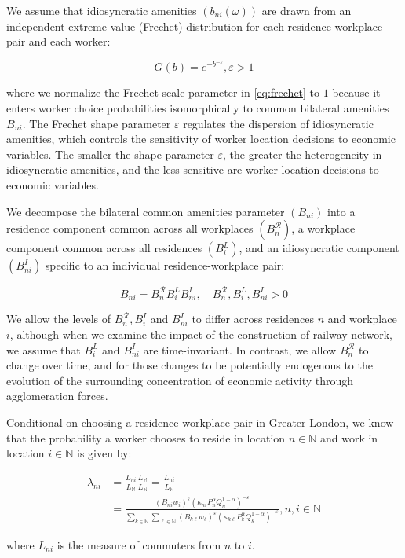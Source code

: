 We assume that idiosyncratic amenities $(b_{ni}(\omega))$ are drawn from an independent extreme value (Frechet) distribution for each residence-workplace pair and each worker:

\begin{equation}
    G(b) = e^{-b^{-\varepsilon}}, \varepsilon > 1 \label{eq:frechet}
\end{equation}

where we normalize the Frechet scale parameter in \eqref{eq:frechet} to $1$ because it enters worker choice probabilities isomorphically to common bilateral amenities $B_{ni}$. The Frechet shape parameter $\varepsilon$ regulates the dispersion of idiosyncratic amenities, which controls the sensitivity of worker location decisions to economic variables. The smaller the shape parameter $\varepsilon$, the greater the heterogeneity in idiosyncratic amenities, and the less sensitive are worker location decisions to economic variables.

We decompose the bilateral common amenities parameter $(B_{ni})$ into a residence component common across all workplaces $(B_n^{\mathcal{R}})$, a workplace component common across all residences $(B_i^L)$, and an idiosyncratic component $(B_{ni}^I)$ specific to an individual residence-workplace pair:

\begin{equation}
    B_{ni} = B_n^{\mathcal{R}}B_i^L B_{ni}^I, \quad B_n^{\mathcal{R}}, B_i^L, B_{ni}^I > 0
\end{equation}

We allow the levels of $B_n^{\mathcal{R}}, B_i^I$ and $B_{ni}^I$ to differ across residences $n$ and workplace $i$, although when we examine the impact of the construction of railway network, we assume that $B_i^L$ and $B_{ni}^I$ are time-invariant. In contrast, we allow $B_n^{\mathcal{R}}$ to change over time, and for those changes to be potentially endogenous to the evolution of the surrounding concentration of economic activity through agglomeration forces.

Conditional on choosing a residence-workplace pair in Greater London, we know that the probability a worker chooses to reside in location $n \in \mathbb{N}$ and work in location $i \in \mathbb{N}$ is given by:

\begin{equation}
    \begin{aligned}
        \lambda_{ni} & = \frac{L_{ni}}{L_{\mathbb{M}}} \frac{L_{\mathbb{M}}}{L_{\mathbb{N}}} = \frac{L_{ni}}{L_{\mathbb{N}}} \\
        & = \frac{(B_{ni} w_i)^{\varepsilon} (\kappa_{ni} P_n^{\alpha} Q_n^{1 - \alpha})^{-\varepsilon}}{\sum_{k \in \mathbb{N}} \sum_{\ell \in \mathbb{N}} (B_{k\ell}w_{\ell})^{\varepsilon} (\kappa_{k\ell} P_{k}^{\alpha} Q_k^{1 - \alpha})^{-\varepsilon} }, n,  i \in \mathbb{N}
    \end{aligned}
\end{equation}

where $L_{ni}$ is the measure of commuters from $n$ to $i$.

